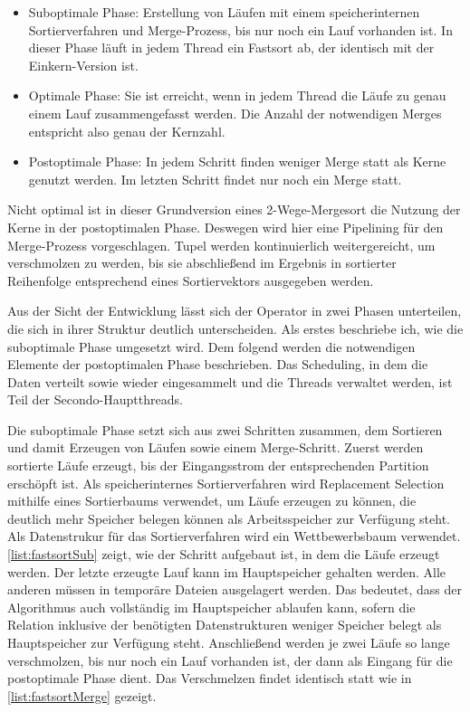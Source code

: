 \documentclass[a4paper,12pt,twoside]{article}
\begin{document}
\begin{itemize}
	\item Suboptimale Phase: Erstellung von Läufen mit einem speicherinternen Sortierverfahren und Merge-Prozess, bis nur noch ein Lauf vorhanden ist. In dieser Phase läuft in jedem Thread ein Fastsort ab, der identisch mit der Einkern-Version ist.
	\item Optimale Phase: Sie ist erreicht, wenn in jedem Thread die Läufe zu genau einem Lauf zusammengefasst werden. Die Anzahl der notwendigen Merges entspricht also genau der Kernzahl. 
	\item Postoptimale Phase: In jedem Schritt finden weniger Merge statt als Kerne genutzt werden. Im letzten Schritt findet nur noch ein Merge statt.
\end{itemize}

Nicht optimal ist in dieser Grundversion eines 2-Wege-Mergesort die Nutzung der Kerne in der postoptimalen Phase. Deswegen wird hier eine Pipelining für den Merge-Prozess vorgeschlagen. Tupel werden kontinuierlich weitergereicht, um verschmolzen zu werden, bis sie abschließend im Ergebnis in sortierter Reihenfolge entsprechend eines Sortiervektors ausgegeben werden. 

Aus der Sicht der Entwicklung lässt sich der Operator in zwei Phasen unterteilen, die sich in ihrer Struktur deutlich unterscheiden. Als erstes beschriebe ich, wie die suboptimale Phase umgesetzt wird. Dem folgend werden die notwendigen Elemente der postoptimalen Phase beschrieben. Das Scheduling, in dem die Daten verteilt sowie wieder eingesammelt und die Threads verwaltet werden, ist Teil der Secondo-Hauptthreads.

Die suboptimale Phase setzt sich aus zwei Schritten zusammen, dem Sortieren und damit Erzeugen von Läufen sowie einem Merge-Schritt. Zuerst werden sortierte Läufe erzeugt, bis der Eingangsstrom der entsprechenden Partition erschöpft ist. Als speicherinternes Sortierverfahren wird Replacement Selection mithilfe eines Sortierbaums verwendet, um Läufe erzeugen zu können, die deutlich mehr Speicher belegen können als Arbeitsspeicher zur Verfügung steht. Als Datenstrukur für das Sortierverfahren wird ein Wettbewerbsbaum verwendet. \autoref{list:fastsortSub} zeigt, wie der Schritt aufgebaut ist, in dem die Läufe erzeugt werden. Der letzte erzeugte Lauf kann im Hauptspeicher gehalten werden. Alle anderen müssen in temporäre Dateien ausgelagert werden. Das bedeutet, dass der Algorithmus auch vollständig im Hauptspeicher ablaufen kann, sofern die Relation inklusive der benötigten Datenstrukturen weniger Speicher belegt als Hauptspeicher zur Verfügung steht. Anschließend werden je zwei Läufe so lange verschmolzen, bis nur noch ein Lauf vorhanden ist, der dann als Eingang für die postoptimale Phase dient. Das Verschmelzen findet identisch statt wie in  \autoref{list:fastsortMerge} gezeigt.
\end{document}
